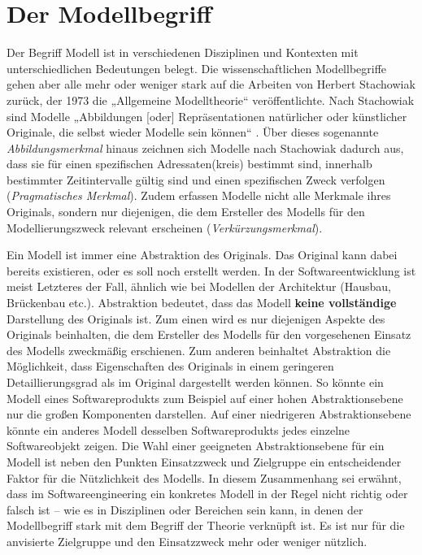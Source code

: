 \section{Der Modellbegriff}
\label{sec:Kap-3.1}

\vspace{-2mm} %

Der Begriff Modell ist in verschiedenen Disziplinen und Kontexten mit unterschiedlichen Bedeutungen belegt. Die wissenschaftlichen Modellbegriffe gehen aber alle mehr oder weniger stark auf die Arbeiten von Herbert Stachowiak zurück, der 1973 die „Allgemeine Modelltheorie“ \cite{sta73} veröffentlichte. Nach Stachowiak sind Modelle „Abbildungen [oder] Repräsentationen natürlicher oder künstlicher Originale, die selbst wieder Modelle sein können“ \cite[131]{sta73}. Über dieses sogenannte \textit{\mbox{Abbildungsmerkmal}} hinaus zeichnen sich Modelle nach Stachowiak dadurch aus, dass sie für einen spezifischen Adressaten(kreis) bestimmt sind, innerhalb bestimmter Zeit\-inter\-valle gültig sind und einen spezifischen Zweck verfolgen (\textit{Pragmatisches Merkmal}). Zudem erfassen Modelle nicht alle Merkmale ihres Originals, sondern nur diejenigen, die dem Ersteller des Modells für den Modellierungszweck relevant erscheinen (\textit{Verkürzungsmerkmal}). 

Ein Modell ist immer eine Abstraktion 
des Originals. Das Original kann dabei bereits existieren, oder es soll noch erstellt werden. In der Softwareentwicklung ist meist Letzteres der Fall, ähnlich wie bei Modellen der Architektur (Hausbau, Brückenbau etc.). Abstraktion bedeutet, dass das Modell \textbf{keine vollständige} Darstellung des Originals ist. Zum einen wird es nur diejenigen Aspekte des Originals beinhalten, die dem Ersteller des Modells für den vorgesehenen Einsatz des Modells zweckmäßig erschienen. Zum anderen beinhaltet Abstraktion die Möglichkeit, dass Eigenschaften des Originals in einem geringeren Detaillierungsgrad als im Original dargestellt werden können. So könnte ein Modell eines Softwareprodukts zum Beispiel auf einer hohen Abstraktionsebene nur die großen Komponenten darstellen. Auf einer niedrigeren Abstraktionsebene könnte ein anderes Modell desselben Softwareprodukts jedes einzelne Softwareobjekt zeigen. Die Wahl einer geeigneten Abstraktionsebene für ein Modell ist neben den Punkten Einsatzzweck und Zielgruppe ein entscheidender Faktor für die Nützlichkeit des Modells. In diesem Zusammenhang sei erwähnt, dass im Softwareengineering ein konkretes Modell in der Regel nicht richtig oder falsch ist – wie es in Disziplinen oder Bereichen sein kann, in denen der Modell\-begriff stark mit dem Begriff der Theorie verknüpft ist. Es ist nur für die anvisierte Zielgruppe und den Einsatzzweck mehr oder weniger nützlich.

